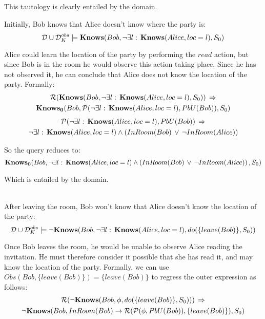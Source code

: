 This tautology is clearly entailed by the domain.\\


\begin{example}
Initially, Bob knows that Alice doesn't know where the party is:\[
\mathcal{D}\cup\mathcal{D}_{K}^{obs}\models\mathbf{Knows}(Bob,\neg\exists l:\,\mathbf{Knows}(Alice,loc=l),S_{0})\]

\end{example}
Alice could learn the location of the party by performing the $read$
action, but since Bob is in the room he would observe this action
taking place. Since he has not observed it, he can conclude that Alice
does not know the location of the party. Formally:\begin{multline*}
\mathcal{R}(\mathbf{Knows}(Bob,\neg\exists l:\,\mathbf{Knows}(Alice,loc=l),S_{0}))\,\Rightarrow\\
\mathbf{Knows_{0}}(Bob,\mathcal{P}(\neg\exists l:\,\mathbf{Knows}(Alice,loc=l),PbU(Bob)),S_{0})\end{multline*}
 \begin{multline*}
\mathcal{P}(\neg\exists l:\,\mathbf{Knows}(Alice,loc=l),PbU(Bob))\,\Rightarrow\\
\neg\exists l:\,\mathbf{Knows}(Alice,loc=l)\wedge\left(InRoom(Bob)\,\vee\,\neg InRoom(Alice)\right)\end{multline*}


So the query reduces to:\[
\mathbf{Knows_{0}}(Bob,\neg\exists l:\,\mathbf{Knows}(Alice,loc=l)\wedge\left(InRoom(Bob)\,\vee\,\neg InRoom(Alice)\right),S_{0})\]


Which is entailed by the domain.\\
 \\


\begin{example}
After leaving the room, Bob won't know that Alice doesn't know the
location of the party:\[
\mathcal{D}\cup\mathcal{D}_{K}^{obs}\models\mathbf{\neg Knows}(Bob,\neg\exists l:\,\mathbf{Knows}(Alice,loc=l),do(\{leave(Bob)\},S_{0}))\]

\end{example}
Once Bob leaves the room, he would be unable to observe Alice reading
the invitation. He must therefore consider it possible that she has
read it, and may know the location of the party. Formally, we can
use $Obs(Bob,\{leave(Bob)\})=\{leave(Bob)\}$ to regress the outer
expression as follows:\begin{multline*}
\mathcal{R}(\neg\mathbf{Knows}(Bob,\phi,do(\{leave(Bob)\},S_{0})))\,\Rightarrow\\
\neg\mathbf{Knows}(Bob,InRoom(Bob)\rightarrow\mathcal{R}(\mathcal{P}(\phi,PbU(Bob)),\{leave(Bob)\}),S_{0})\end{multline*}


